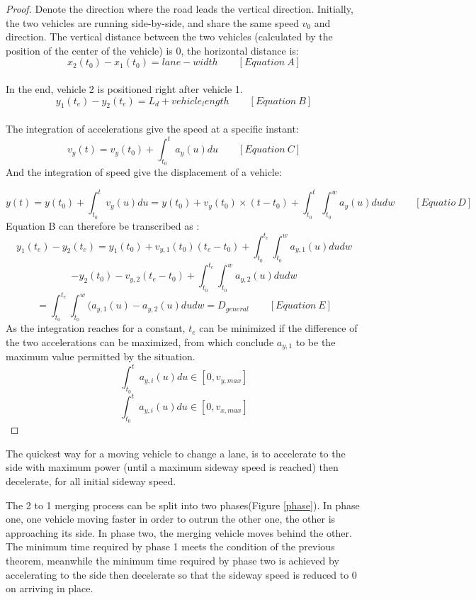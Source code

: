 \documentclass{mcmthesis}
\newcommand{\reffig}[1]{Figure \ref{#1}}
\begin{document}
\begin{proof}
Denote the direction where the road leads the vertical direction.
Initially, the two vehicles are running side-by-side, and share the same speed $v_0$ and direction.
The vertical distance between the two vehicles (calculated by the position of the center of the vehicle) is 0, the horizontal distance is: $$x_2(t_0)-x_1(t_0)=lane-width \qquad [Equation\ A]$$\\
In the end, vehicle 2 is positioned right after vehicle 1.
$$y_1(t_e)-y_2(t_e)=L_d+vehicle_length \qquad [Equation\ B]$$\\
The integration of accelerations give the speed at a specific instant:
 $$v_y(t)=v_y(t_0)+ \int_{t_0}^{t}a_y(u)du \qquad [Equation\ C]$$
And the integration of speed give the displacement of a vehicle:

$$y(t)=y(t_0)+ \int_{t_0}^{t}v_y(u)du=y(t_0)+v_y(t_0) \times (t-t_0)+ \int_{t_0}^{t}\int_{t_0}^{w}a_y(u)dudw \qquad [Equatio\ D]$$
Equation B can therefore be transcribed as :
$$y_1(t_e)-y_2(t_e)=y_1(t_0)+v_{y,1}(t_0)(t_e-t_0)+\int_{t_0}^{t_e}\int_{t_0}^{w}a_{y,1}(u)dudw$$
$$-y_2(t_0)-v_{y,2}(t_e-t_0)+\int_{t_0}^{t_e}\int_{t_0}^{w}a_{y,2}(u)dudw$$
$$ =\int_{t_0}^{t_e}\int_{t_0}^{w}(a_{y,1}(u)-a_{y,2}(u)dudw=D_{general}\qquad [Equation\ E]$$
As the integration reaches for a constant, $t_e$ can be minimized if the difference of the two accelerations can be maximized, from which conclude $a_{y,1}$ to be the maximum value permitted by the situation.
$$ \int_{t_0}^{t}a_{y,i}(u)du \in [0, v_{y,max}]$$
$$ \int_{t_0}^{t}a_{y,i}(u)du \in [0, v_{x,max}]$$
\end{proof}

\begin{Theorem} \label{thm:yingsongsheng3}
The quickest way for a moving vehicle to change a lane, is to accelerate to the side with maximum power (until a maximum sideway speed is reached) then decelerate, for all initial sideway speed.
\end{Theorem}

The 2 to 1 merging process can be split into two phases(\reffig{phase}). In phase one, one vehicle moving faster in order to outrun the other one, the other is approaching its side. In phase two, the merging vehicle moves behind the other. The minimum time required by phase 1 meets the condition of the previous theorem, meanwhile the minimum time required by phase two is achieved by accelerating to the side then decelerate so that the sideway speed is reduced to 0 on arriving in place.
\end{document}
